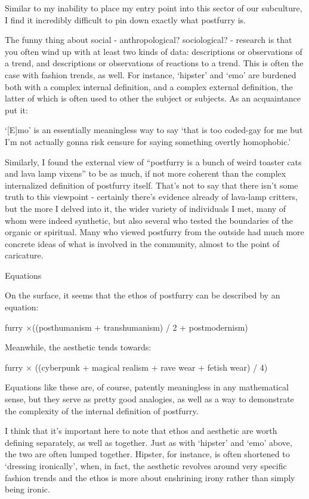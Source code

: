 Similar to my inability to place my entry point into this sector of our subculture, I find it incredibly difficult to pin down exactly what postfurry is.

The funny thing about social - anthropological? sociological? - research is that you often wind up with at least two kinds of data: descriptions or observations of a trend, and descriptions or observations of reactions to a trend.{ }This is often the case with fashion trends, as well.{ }For instance, `hipster' and `emo' are burdened both with a complex internal definition, and a complex external definition, the latter of which is often used to other the subject or subjects.{ }As an acquaintance put it:

`{[}E{]}mo' is an essentially meaningless way to say `that is too coded-gay for me but I'm not actually gonna risk censure for saying something overtly homophobic.'

Similarly, I found the external view of ``postfurry is a bunch of weird toaster cats and lava lamp vixens'' to be as much, if not more coherent than the complex internalized definition of postfurry itself. That's not to say that there isn't some truth to this viewpoint - certainly there's evidence already of lava-lamp critters, but the more I delved into it, the wider variety of individuals I met, many of whom were indeed synthetic, but also several who tested the boundaries of the organic or spiritual. Many who viewed postfurry from the outside had much more concrete ideas of what is involved in the community, almost to the point of caricature.

Equations

On the surface, it seems that the ethos of postfurry can be described by an equation:

furry ×((posthumanism + transhumanism) / 2 + postmodernism)

Meanwhile, the aesthetic tends towards:

furry × ((cyberpunk + magical realism + rave wear + fetish wear) / 4)

Equations like these are, of course, patently meaningless in any mathematical sense, but they serve as pretty good analogies, as well as a way to demonstrate the complexity of the internal definition of postfurry.

I think that it's important here to note that ethos and aesthetic are worth defining separately, as well as together.{ }Just as with `hipster' and `emo' above, the two are often lumped together.{ }Hipster, for instance, is often shortened to `dressing ironically', when, in fact, the aesthetic revolves around very specific fashion trends and the ethos is more about enshrining irony rather than simply being ironic.

